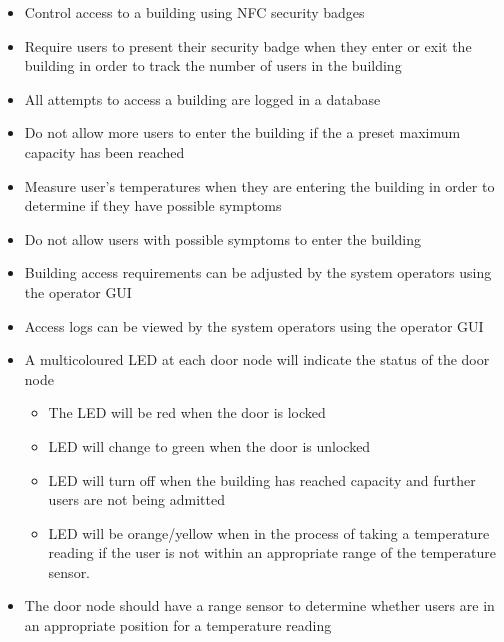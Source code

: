 \begin{itemize}
    \item Control access to a building using NFC security badges
    \item Require users to present their security badge when they enter or exit
          the building in order to track the number of users in the building
    \item All attempts to access a building are logged in a database
    \item Do not allow more users to enter the building if the a preset maximum
          capacity has been reached
    \item Measure user's temperatures when they are entering the building in
          order to determine if they have possible symptoms
    \item Do not allow users with possible symptoms to enter the building
    \item Building access requirements can be adjusted by the system operators
          using the operator GUI
    \item Access logs can be viewed by the system operators
          using the operator GUI
    \item A multicoloured LED at each door node will
          indicate the status of the door node
    \begin{itemize}
        \item The LED will be red when the door is locked
        \item LED will change to green when the door is unlocked
        \item LED will turn off when the building has reached capacity and
              further users are not being admitted
        \item LED will be orange/yellow when in the process of taking a temperature
              reading if the user is not within an appropriate range of the
              temperature sensor.
    \end{itemize}
    \item The door node should have a range sensor to determine whether users
          are in an appropriate position for a temperature reading
\end{itemize}
